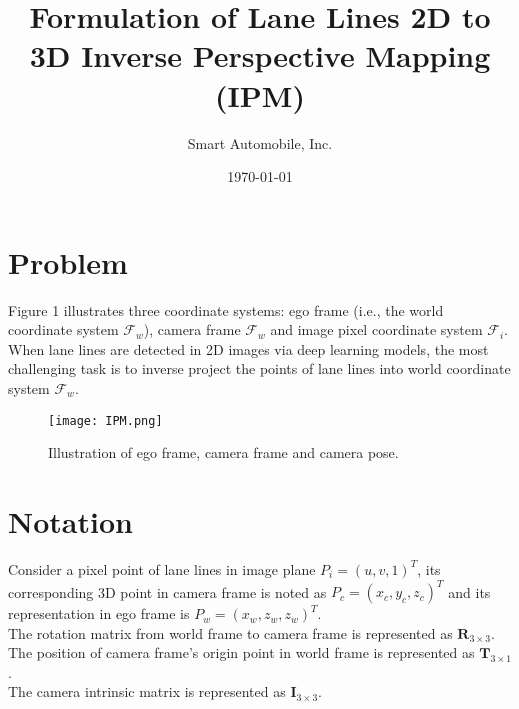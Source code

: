 \documentclass[
	letterpaper, %
	10pt, %
]{CSUniSchoolLabReport}
\title{Formulation of Lane Lines 2D to 3D Inverse Perspective Mapping (IPM)} %
\author{Smart Automobile, Inc.} %
\date{\today} %
\begin{document}
\maketitle %




\section{Problem}
Figure 1 illustrates three coordinate systems: ego frame (i.e., the world coordinate system $\mathcal{F}_w$), camera frame $\mathcal{F}_w$ and image pixel coordinate system $\mathcal{F}_i$. When lane lines are detected in 2D images via deep learning models, the most challenging task is to inverse project the points of lane lines into world coordinate system $\mathcal{F}_w$.


\begin{figure}[H] %
	\centering %
	\texttt{[image: IPM.png]} %
	\caption{Illustration of ego frame, camera frame and camera pose.}
\end{figure}

\section{Notation}
Consider a pixel point of lane lines in image plane $P_i = (u, v, 1)^T$, its corresponding 3D point in camera frame is noted as $P_c = (x_c, y_c, z_c)^T$ and its representation in ego frame is $P_w = (x_w, z_w, z_w)^T$. \\

The rotation matrix from world frame to camera frame is represented as $\bm{R}_{3\times 3}$.\\
The position of camera frame's origin point in world frame is represented as $\bm{T}_{3\times 1}$.\\
The camera intrinsic matrix is represented as $\bm{I}_{3\times 3}$.\\
\end{document}
